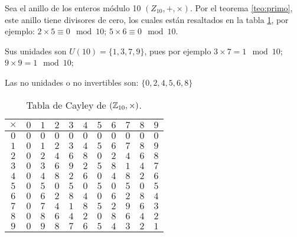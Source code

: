 \begin{fmd-example}
Sea el anillo de los enteros módulo 10 $(Z_{10}, +, \times)$. Por el teorema \ref{teo:primo}, este anillo tiene divisores de cero, los cuales están resaltados en la tabla \ref{tab:mod10x}, por ejemplo: $2 \times 5 \equiv 0 \mod{10}$; $5 \times 6 \equiv 0 \mod{10}$.

Sus unidades son $U(10) = \{ 1, 3, 7, 9 \}$, pues por ejemplo $3 \times 7 = 1 \mod{10}$; $9 \times 9 = 1 \mod{10}$;

Las no unidades o no invertibles son: $\{ 0, 2, 4, 5, 6, 8\}$
	\begin{table}[H]
		\centering
		\begin{tabular}{c|cccccccccc}
			$\times$ & $0$ & $1$ & $2$ & $3$ & $4$ & $5$ & $6$ & $7$ & $8$ & $9$ \\ \hline
			$0$ & $0$ & $0$ & $0$ & $0$ & $0$ & $0$ & $0$ & $0$ & $0$ & $0$ \\
			$1$ & $0$ & \cellcolor{yellow!40} $\!\!1$ & $2$ & $3$ & $4$ & $5$ & $6$ & $7$ & $8$ & $9$ \\
			$2$ & $0$ & $2$ & $4$ & $6$ & $8$ & \cellcolor{blue!10} $\!\!0$ & $2$ & $4$ & $6$ & $8$ \\
			$3$ & $0$ & $3$ & $6$ & $9$ & $2$ & $5$ & $8$ & \cellcolor{yellow!40} $\!\!1$ & $4$ & $7$ \\
			$4$ & $0$ & $4$ & $8$ & $2$ & $6$ & \cellcolor{blue!10} $\!\!0$ & $4$ & $8$ & $2$ & $6$ \\
			$5$ & $0$ & $5$ & \cellcolor{blue!10} $\!\!0$ & $5$ & \cellcolor{blue!10} $\!\!0$ & $5$ & \cellcolor{blue!10} $\!\!0$ & $5$ & \cellcolor{blue!10} $\!\!0$ & $5$ \\
			$6$ & $0$ & $6$ & $2$ & $8$ & $4$ & \cellcolor{blue!10} $\!\!0$ & $6$ & $2$ & $8$ & $4$ \\
			$7$ & $0$ & $7$ & $4$ &\cellcolor{yellow!40} $\!\!1$ & $8$ & $5$ & $2$ & $9$ & $6$ & $3$ \\
			$8$ & $0$ & $8$ & $6$ & $4$ & $2$ & \cellcolor{blue!10} $\!\!0$ & $8$ & $6$ & $4$ & $2$ \\
			$9$ & $0$ & $9$ & $8$ & $7$ & $6$ & $5$ & $4$ & $3$ & $2$ & \cellcolor{yellow!40} $\!\!1$
		\end{tabular}
		\caption{Tabla de Cayley de $(\mathbb{Z}_{10}, \times)$.}
		\label{tab:mod10x}
	\end{table}
\end{fmd-example}

